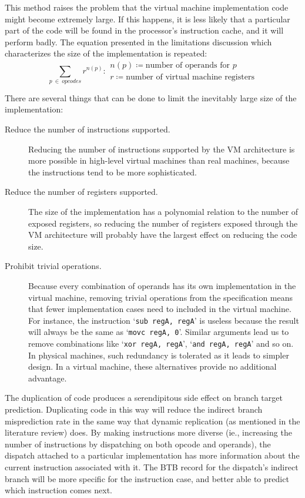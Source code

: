 	This method raises the problem that the virtual machine implementation code might become extremely large. If this happens, it is less likely that a particular part of the code will be found in the processor's instruction cache, and it will perform badly. The equation presented in the limitations discussion which characterizes the size of the implementation is repeated:
	\nopagebreak
	\[
		\sum_{p~\in~opcodes} r^{n(p)} : 
		\begin{array}{l}
			n(p) \coloneqq \text{number of operands for $p$} \\
			r \coloneqq \text{number of virtual machine registers}
		\end{array}
	\] 
	
	There are several things that can be done to limit the inevitably large size of the implementation:
	
	\begin{description}
		\item[Reduce the number of instructions supported.] Reducing the number of instructions supported by the VM architecture is more possible in high-level virtual machines than real machines, because the instructions tend to be more sophisticated.
		\item[Reduce the number of registers supported.] The size of the implementation has a polynomial relation to the number of exposed registers, so reducing the number of registers exposed through the VM architecture will probably have the largest effect on reducing the code size.
		\item[Prohibit trivial operations.] Because every combination of operands has its own implementation in the virtual machine, removing trivial operations from the specification means that fewer implementation cases need to included in the virtual machine. For instance, the instruction `\texttt{sub regA, regA}' is useless because the result will always be the same as `\texttt{movc regA, 0}'. Similar arguments lead us to remove combinations like `\texttt{xor regA, regA}', `\texttt{and regA, regA}' and so on. In physical machines, such redundancy is tolerated as it leads to simpler design. In a virtual machine, these alternatives provide no additional advantage.
	\end{description}
	
	The duplication of code produces a serendipitous side effect on branch target prediction. Duplicating code in this way will reduce the indirect branch misprediction rate in the same way that dynamic replication (as mentioned in the literature review) does. By making instructions more diverse (ie., increasing the number of instructions by dispatching on both opcode and operands), the dispatch attached to a particular implementation has more information about the current instruction associated with it. The BTB record for the dispatch's indirect branch will be more specific for the instruction case, and better able to predict which instruction comes next.
	
